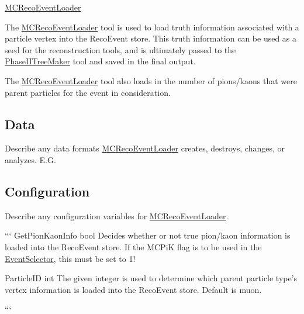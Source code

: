 \hyperlink{classMCRecoEventLoader}{M\-C\-Reco\-Event\-Loader}

The \hyperlink{classMCRecoEventLoader}{M\-C\-Reco\-Event\-Loader} tool is used to load truth information associated with a particle vertex into the Reco\-Event store. This truth information can be used as a seed for the reconstruction tools, and is ultimately passed to the \hyperlink{classPhaseIITreeMaker}{Phase\-I\-I\-Tree\-Maker} tool and saved in the final output.

The \hyperlink{classMCRecoEventLoader}{M\-C\-Reco\-Event\-Loader} tool also loads in the number of pions/kaons that were parent particles for the event in consideration.

\subsection*{Data}

Describe any data formats \hyperlink{classMCRecoEventLoader}{M\-C\-Reco\-Event\-Loader} creates, destroys, changes, or analyzes. E.\-G.

\subsection*{Configuration}

Describe any configuration variables for \hyperlink{classMCRecoEventLoader}{M\-C\-Reco\-Event\-Loader}.

``` Get\-Pion\-Kaon\-Info bool Decides whether or not true pion/kaon information is loaded into the Reco\-Event store. If the M\-C\-Pi\-K flag is to be used in the \hyperlink{classEventSelector}{Event\-Selector}, this must be set to 1!

Particle\-I\-D int The given integer is used to determine which parent particle type's vertex information is loaded into the Reco\-Event store. Default is muon.

``` 